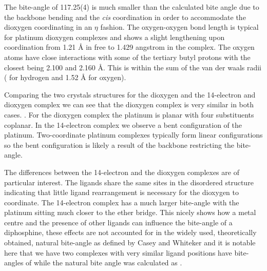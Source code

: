 The bite-angle of 117.25(4)\degrees{} is much smaller than the calculated bite angle  due to the backbone bending and the \emph{cis} coordination in order to accommodate the dioxygen coordinating in an $\eta$ fashion.  The oxygen-oxygen bond length is typical for platinum dioxygen complexes  and shows a slight lengthening upon coordination from 1.21 \si{\angstrom} in free  to 1.429 \si{angstrom} in the complex.  The oxygen atoms have close interactions with some of the tertiary butyl protons with the closest being 2.100 and 2.160 \si{\angstrom}.  This is within the sum of the van der waals radii ( for hydrogen and 1.52 \si{\angstrom} for oxygen).   

Comparing the two crystals structures for the dioxygen and the  14-electron and dioxygen complex we can see that the dioxygen complex is very similar in both cases.  .   For the dioxygen complex the platinum is planar with four substituents coplanar.  In the 14-electron complex we observe a bent configuration of the platinum.  Two-coordinate platinum complexes typically form linear configurations  so the bent configuration is likely a result of the backbone restricting the bite-angle.  


The differences between the 14-electron and the dioxygen complexes are of particular interest.  The ligands share the same sites in the disordered structure indicating that little ligand rearrangement is necessary for the dioxygen to coordinate.  The 14-electron complex has a much larger bite-angle  with the platinum sitting much closer to the ether bridge.  This nicely shows how a metal centre and the presence of other ligands can influence the bite-angle of a diphosphine, these effects are not accounted for in the widely used, theoretically obtained, natural bite-angle as defined by Casey and Whiteker\cite{Casey1990} and it is notable here that we have two complexes with very similar ligand positions have bite-angles of  while the natural bite angle was calculated as .



